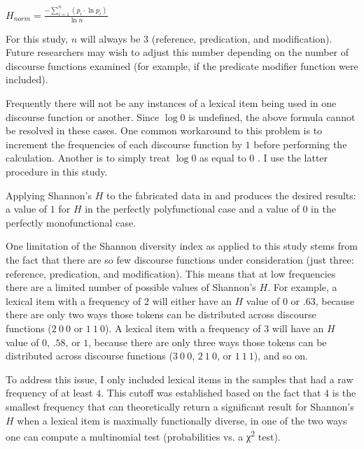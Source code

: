 \begin{exe}
  \ex\label{ex:Shannon-H}
  $H_{norm} = \displaystyle\frac{-\displaystyle\sum_{i = 1}^{n}(p_i \cdot \ln p_i)}{\ln n}$
\end{exe}

\noindent For this study, $n$ will always be $3$ (reference, predication, and modification). Future researchers may wish to adjust this number depending on the number of discourse functions examined (for example, if the predicate modifier function were included).

Frequently there will not be any instances of a lexical item being used in one discourse function or another. Since $\log 0$ is undefined, the above formula cannot be resolved in these cases. One common workaround to this problem is to increment the frequencies of each discourse function by $1$ before performing the calculation. Another is to simply treat $\log 0$ as equal to $0$ \parencite[120--121]{Gries2013}. I use the latter procedure in this study.

Applying Shannon's $H$ to the fabricated data in  and  produces the desired results: a value of $1$ for $H$ in the perfectly polyfunctional case and a value of $0$ in the perfectly monofunctional case.

One limitation of the Shannon diversity index as applied to this study stems from the fact that there are so few discourse functions under consideration (just three: reference, predication, and modification). This means that at low frequencies there are a limited number of possible values of Shannon's $H$. For example, a lexical item with a frequency of $2$ will either have an $H$ value of $0$ or $.63$, because there are only two ways those tokens can be distributed across discourse functions ($2\ 0\ 0$ or $1\ 1\ 0$). A lexical item with a frequency of $3$ will have an $H$ value of $0$, $.58$, or $1$, because there are only three ways those tokens can be distributed across discourse functions ($3\ 0\ 0$, $2\ 1\ 0$, or $1\ 1\ 1$), and so on.

To address this issue, I only included lexical items in the samples that had a raw frequency of at least $4$. This cutoff was established based on the fact that $4$ is the smallest frequency that can theoretically return a significant result for Shannon's $H$ when a lexical item is maximally functionally diverse, in one of the two ways one can compute a multinomial test (probabilities vs. a χ\textsuperscript{2} test).

